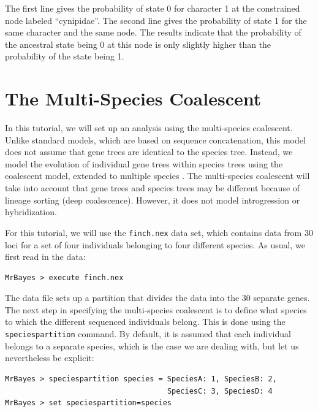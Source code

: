 \documentclass[12pt]{book}
\newcommand{\ttt}[1]{\texttt{#1}}
\begin{document}
The first line gives the probability of state 0 for character 1 at the constrained node labeled
``cynipidae''. The second line gives the probability of state 1 for the same character and the same
node. The results indicate that the probability of the ancestral state being 0 at this node is only
slightly higher than the probability of the state being 1.

\section{The Multi-Species Coalescent}

In this tutorial, we will set up an analysis using the multi-species coalescent. Unlike standard
models, which are based on sequence concatenation, this model does not assume that gene trees are
identical to the species tree. Instead, we model the evolution of individual gene trees within
species trees using the coalescent model, extended to multiple species \citep{liu07,edwards07}. The
multi-species coalescent will take into account that gene trees and species trees may be different
because of lineage sorting (deep coalescence). However, it does not model introgression or
hybridization.

For this tutorial, we will use the \ttt{finch.nex} data set, which contains data from 30 loci for a
set of four individuals belonging to four different species. As usual, we first read in the data:

\begin{verbatim}
MrBayes > execute finch.nex
\end{verbatim}

The data file sets up a partition that divides the data into the 30 separate genes. The next step
in specifying the multi-species coalescent is to define what species to which the different
sequenced individuals belong. This is done using the \ttt{speciespartition} command. By default, it
is assumed that each individual belongs to a separate species, which is the case we are dealing
with, but let us nevertheless be explicit:

\begin{singlespacing}
\begin{verbatim}
MrBayes > speciespartition species = SpeciesA: 1, SpeciesB: 2,
                                     SpeciesC: 3, SpeciesD: 4
MrBayes > set speciespartition=species
\end{verbatim}
\end{singlespacing}
\end{document}
